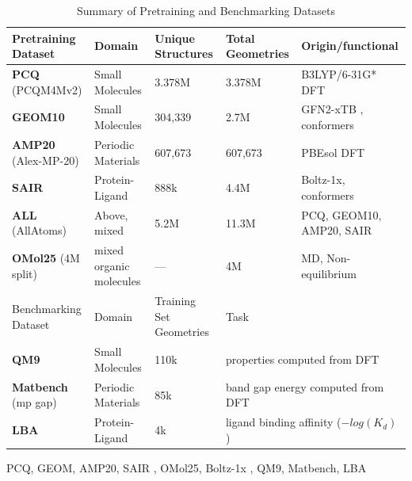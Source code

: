 
\begin{table}[t]
    \centering
    \caption{Summary of Pretraining and Benchmarking Datasets}
    \label{tab:dataset_summary}
    \small
    \setlength{\tabcolsep}{4pt}
    \renewcommand{\arraystretch}{1.15}
    
    \begin{tabular}{l l l l l}
   
    \toprule
         Pretraining Dataset&  Domain&  Unique Structures & Total Geometries& Origin/functional\\
         \midrule
         \textbf{PCQ} (PCQM4Mv2) & Small Molecules &  3.378M &  3.378M & B3LYP/6-31G* DFT\\
         \textbf{GEOM10} & Small Molecules &  304,339&  2.7M& GFN2-xTB , conformers\\
         \textbf{AMP20} (Alex-MP-20)  &  Periodic Materials &  607,673&  607,673& PBEsol DFT\\
         \textbf{SAIR} &  Protein-Ligand &    888k& 4.4M& Boltz-1x, conformers \\
         \textbf{ALL} (AllAtoms) &  Above, mixed & 5.2M & 11.3M & PCQ, GEOM10, AMP20, SAIR \\
         \textbf{OMol25} (4M split) &  mixed organic molecules&  ---  &  4M & MD, Non-equilibrium\\
         
        \midrule
        Benchmarking Dataset &  Domain &  Training Set Geometries &  \multicolumn{2}{l}{Task}\\
        \midrule
        \textbf{QM9} & Small Molecules  &  110k &  \multicolumn{2}{l}{properties computed from DFT}\\
        \textbf{Matbench} (mp gap) & Periodic Materials  & 85k &  \multicolumn{2}{l}{band gap energy computed from DFT} \\
        \textbf{LBA} & Protein-Ligand & 4k &  \multicolumn{2}{l}{ligand binding affinity ($-log(K_d) $) } \\
    \bottomrule
    \end{tabular}
    
    \footnotesize PCQ\cite{PubChemQC_Nakata2017}, GEOM\cite{GEOM_axelrod2022}, AMP20\cite{MaterialsProject, Alexandria_1, Alexandria_2}, SAIR \cite{Sair_dataset}, OMol25\cite{OMOL25_levine2025open},  Boltz-1x \cite{boltz1_2024}, QM9\cite{QM9_Ramakrishnan2014}, Matbench\cite{matbench_2020}, LBA\cite{LBA_dataset} 
\end{table}